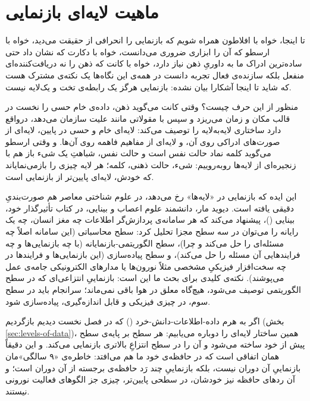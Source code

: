 \newpage
\section{ماهیت لایه‌ای بازنمایی}
\label{sec:layered-representation}

تا اینجا، خواه با افلاطون همراه شویم که بازنمایی را انحرافی از حقیقت می‌دید، خواه با ارسطو که آن را ابزاری ضروری می‌دانست، خواه با دکارت که نشان داد حتی ساده‌ترین ادراک ما به داوریِ ذهن نیاز دارد، خواه با کانت که ذهن را نه دریافت‌کننده‌ای منفعل بلکه سازنده‌ی فعال تجربه دانست در همه‌ی این نگاه‌ها یک نکته‌ی مشترک هست که شاید تا اینجا آشکارا بیان نشده: بازنمایی هرگز یک رابطه‌ی تخت و یک‌لایه نیست.

منظور از این حرف چیست؟ وقتی کانت می‌گوید ذهن، داده‌ی خام حسی را نخست در قالب مکان و زمان می‌ریزد و سپس با مقولاتی مانند علیت سازمان می‌دهد، درواقع دارد ساختاری لایه‌به‌لایه را توصیف می‌کند: لایه‌ای خام و حسی در پایین، لایه‌ای از صورت‌های ادراکی روی آن، و لایه‌ای از مفاهیم فاهمه روی آن‌ها. و وقتی ارسطو می‌گوید کلمه نماد حالت نفس است و حالت نفس، شباهتِ یک شیء باز هم با زنجیره‌ای از لایه‌ها روبه‌روییم: شیء، حالت ذهنی، کلمه؛ هر لایه چیزی را بازمی‌نمایاند که خودش، لایه‌ای پایین‌تر از بازنمایی است.

این ایده که بازنمایی در «لایه‌ها» رخ می‌دهد، در علوم شناختی معاصر هم صورت‌بندیِ دقیقی یافته است. دیوید مار، دانشمند علوم اعصاب و بینایی، در کتاب تأثیرگذار خود، بینایی ()، پیشنهاد می‌کند که هر سامانه‌ی پردازش‌گر اطلاعات چه مغز انسان، چه یک رایانه را می‌توان در سه سطح مجزا تحلیل کرد: سطح محاسباتی (این سامانه اصلاً چه مسئله‌ای را حل می‌کند و چرا)، سطح الگوریتمی-بازنمایانه (با چه بازنمایی‌ها و چه فرایندهایی آن مسئله را حل می‌کند)، و سطح پیاده‌سازی (این بازنمایی‌ها و فرایندها در چه سخت‌افزار فیزیکیِ مشخصی مثلاً نورون‌ها یا مدارهای الکترونیکی جامه‌ی عمل می‌پوشند)\autocite{marr1982}. نکته‌ی کلیدی برای بحث ما این است: بازنماییِ انتزاعی‌ای که در سطح الگوریتمی توصیف می‌شود، هیچ‌گاه معلق در هوا باقی نمی‌ماند؛ سرانجام باید در سطح سوم، در چیزی فیزیکی و قابل اندازه‌گیری، پیاده‌سازی شود.

اگر به هرم داده-اطلاعات-دانش-خرد () که در فصل نخست دیدیم بازگردیم (بخش \ref{sec:levels-of-data})، همین ساختار لایه‌ای را دوباره می‌یابیم: هر سطح بر پایه‌ی سطح پیش از خود ساخته می‌شود و آن را در سطح انتزاعِ بالاتری بازنمایی می‌کند. و این دقیقاً همان اتفاقی است که در حافظه‌ی خود ما هم می‌افتد: خاطره‌ی «۹ سالگی»مان بازنماییِ آن دوران نیست، بلکه بازنماییِ چند رَد حافظه‌ی برجسته از آن دوران است؛ و آن ردهای حافظه نیز خودشان، در سطحی پایین‌تر، چیزی جز الگوهای فعالیت نورونی نیستند.

